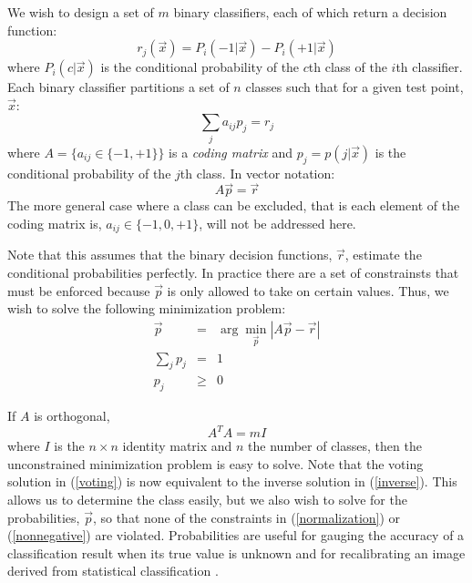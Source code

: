 We wish to design a set of $m$ binary classifiers, each of which return a 
decision function:
\begin{equation}
r_j(\vec x) = P_i(-1 | \vec x) - P_i(+1 | \vec x)
\end{equation}
where $P_i(c | \vec x)$ is the conditional probability of the $c$th class of
the $i$th classifier.
Each binary classifier partitions a set of $n$ classes such that for a
given test point, $\vec x$:
\begin{equation}
\sum_j a_{ij} p_j = r_j
\end{equation}
where $A=\lbrace a_{ij} \in \lbrace -1, +1 \rbrace  \rbrace$ is a {\it coding
matrix} and $p_j = p(j | \vec x)$ is the conditional probability of the $j$th
class.
In vector notation:
\begin{equation}
	A \vec p = \vec r \label{inverse}
\end{equation}
The more general case where a class can be excluded, that is each element of 
the coding matrix is, $a_{ij} \in \lbrace -1, 0, +1\rbrace$, 
will not be addressed here.

Note that this assumes that the binary decision functions, $\vec r$,
estimate the conditional probabilities perfectly.
In practice
there are a set of constrainsts that must be enforced
because $\vec p$ is only allowed to take on certain values.
Thus, we wish to solve the following minimization problem:
\begin{eqnarray}
	\vec p & = & \arg \min_{\vec p} | A \vec p - \vec r | \label{minimization}\\
	\sum_j p_j & = & 1 \label{normalization}\\
	p_j & \ge & 0 \label{nonnegative}
\end{eqnarray}

If $A$ is orthogonal,
\begin{equation}
	A^T A = m I
\end{equation}
where $I$ is the $n \times n$ identity matrix and $n$ the number of classes,
then the unconstrained minimization problem is easy to solve. 
Note that the voting solution in (\ref{voting}) is now equivalent to
the inverse solution in (\ref{inverse}).
This allows us to determine the class easily, but we also wish to solve for
the probabilities, $\vec p$, so that none of the constraints in 
(\ref{normalization}) or (\ref{nonnegative}) are violated.
Probabilities are useful for gauging the accuracy of a classification result
when its true value is unknown and for recalibrating an image derived from
statistical classification \citep{Fawcett2006,Mills2009,Mills2011}.

